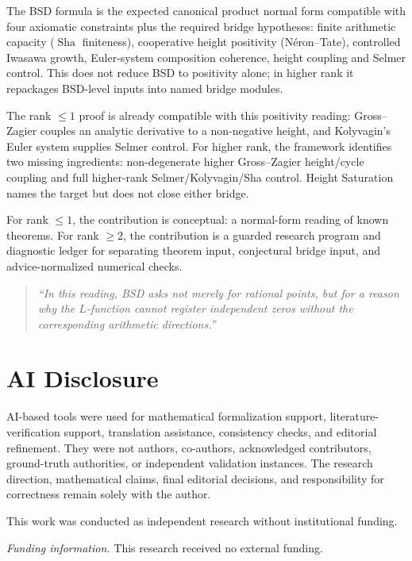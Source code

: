 \documentclass[aps,prd,twocolumn,superscriptaddress,nofootinbib,floatfix]{revtex4-2}
\theoremstyle{definition}
\theoremstyle{remark}
\DeclareMathOperator{\Sha}{Sha}
\begin{document}
The BSD formula is the expected canonical product normal form compatible with four axiomatic constraints plus the required bridge hypotheses: finite arithmetic capacity ($\Sha$ finiteness), cooperative height positivity (Néron--Tate), controlled Iwasawa growth, Euler-system composition coherence, height coupling and Selmer control. This does not reduce BSD to positivity alone; in higher rank it repackages BSD-level inputs into named bridge modules.

The rank $\leq 1$ proof is already compatible with this positivity reading: Gross--Zagier couples an analytic derivative to a non-negative height, and Kolyvagin's Euler system supplies Selmer control. For higher rank, the framework identifies two missing ingredients: non-degenerate higher Gross--Zagier height/cycle coupling and full higher-rank Selmer/Kolyvagin/Sha control. Height Saturation names the target but does not close either bridge.

For rank $\leq 1$, the contribution is conceptual: a normal-form reading of known theorems. For rank $\geq 2$, the contribution is a guarded research program and diagnostic ledger for separating theorem input, conjectural bridge input, and advice-normalized numerical checks.

\begin{quote}
\textit{``In this reading, BSD asks not merely for rational points, but for a reason why the $L$-function cannot register independent zeros without the corresponding arithmetic directions.''}
\end{quote}

\section*{AI Disclosure}
AI-based tools were used for mathematical formalization support, literature-verification support, translation assistance, consistency checks, and editorial refinement. They were not authors, co-authors, acknowledged contributors, ground-truth authorities, or independent validation instances. The research direction, mathematical claims, final editorial decisions, and responsibility for correctness remain solely with the author.


\begin{acknowledgments}
This work was conducted as independent research without institutional funding.

\textit{Funding information.} This research received no external funding.
\end{acknowledgments}
\end{document}
